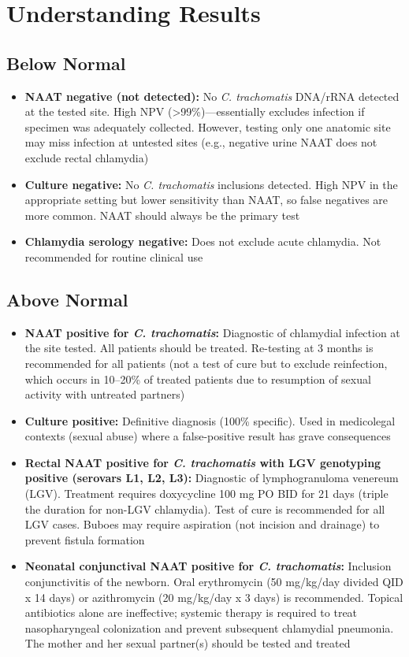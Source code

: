 \section*{Understanding Results}

\subsection*{Below Normal}
\begin{itemize}
  \item \textbf{NAAT negative (not detected):} No \textit{C. trachomatis} DNA/rRNA detected at the tested site. High NPV (>99\%)---essentially excludes infection if specimen was adequately collected. However, testing only one anatomic site may miss infection at untested sites (e.g., negative urine NAAT does not exclude rectal chlamydia)
  \item \textbf{Culture negative:} No \textit{C. trachomatis} inclusions detected. High NPV in the appropriate setting but lower sensitivity than NAAT, so false negatives are more common. NAAT should always be the primary test
  \item \textbf{Chlamydia serology negative:} Does not exclude acute chlamydia. Not recommended for routine clinical use
\end{itemize}

\subsection*{Above Normal}
\begin{itemize}
  \item \textbf{NAAT positive for \textit{C. trachomatis}:} Diagnostic of chlamydial infection at the site tested. All patients should be treated. Re-testing at 3 months is recommended for all patients (not a test of cure but to exclude reinfection, which occurs in 10--20\% of treated patients due to resumption of sexual activity with untreated partners)
  \item \textbf{Culture positive:} Definitive diagnosis (100\% specific). Used in medicolegal contexts (sexual abuse) where a false-positive result has grave consequences
  \item \textbf{Rectal NAAT positive for \textit{C. trachomatis} with LGV genotyping positive (serovars L1, L2, L3):} Diagnostic of lymphogranuloma venereum (LGV). Treatment requires doxycycline 100 mg PO BID for 21 days (triple the duration for non-LGV chlamydia). Test of cure is recommended for all LGV cases. Buboes may require aspiration (not incision and drainage) to prevent fistula formation
  \item \textbf{Neonatal conjunctival NAAT positive for \textit{C. trachomatis}:} Inclusion conjunctivitis of the newborn. Oral erythromycin (50 mg/kg/day divided QID x 14 days) or azithromycin (20 mg/kg/day x 3 days) is recommended. Topical antibiotics alone are ineffective; systemic therapy is required to treat nasopharyngeal colonization and prevent subsequent chlamydial pneumonia. The mother and her sexual partner(s) should be tested and treated
\end{itemize}

